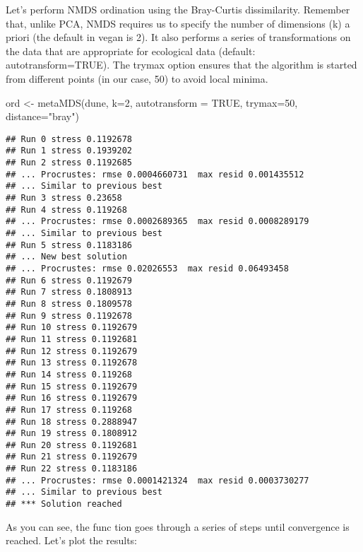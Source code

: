 \documentclass[
]{book}
\newenvironment{Shaded}{\begin{snugshade}}{\end{snugshade}}
\newcommand{\AttributeTok}[1]{\textcolor[rgb]{0.77,0.63,0.00}{#1}}
\newcommand{\ConstantTok}[1]{\textcolor[rgb]{0.00,0.00,0.00}{#1}}
\newcommand{\DecValTok}[1]{\textcolor[rgb]{0.00,0.00,0.81}{#1}}
\newcommand{\FunctionTok}[1]{\textcolor[rgb]{0.00,0.00,0.00}{#1}}
\newcommand{\NormalTok}[1]{#1}
\newcommand{\OtherTok}[1]{\textcolor[rgb]{0.56,0.35,0.01}{#1}}
\newcommand{\StringTok}[1]{\textcolor[rgb]{0.31,0.60,0.02}{#1}}
\begin{document}
Let's perform NMDS ordination using the Bray-Curtis dissimilarity. Remember that, unlike PCA, NMDS requires us to specify the number of dimensions (k) a priori (the default in vegan is 2). It also performs a series of transformations on the data that are appropriate for ecological data (default: autotransform=TRUE). The trymax option ensures that the algorithm is started from different points (in our case, 50) to avoid local minima.

\begin{Shaded}
\begin{Highlighting}[]
\NormalTok{ord }\OtherTok{\textless{}{-}} \FunctionTok{metaMDS}\NormalTok{(dune, }\AttributeTok{k=}\DecValTok{2}\NormalTok{, }\AttributeTok{autotransform =} \ConstantTok{TRUE}\NormalTok{, }\AttributeTok{trymax=}\DecValTok{50}\NormalTok{, }\AttributeTok{distance=}\StringTok{"bray"}\NormalTok{)}
\end{Highlighting}
\end{Shaded}

\begin{verbatim}
## Run 0 stress 0.1192678 
## Run 1 stress 0.1939202 
## Run 2 stress 0.1192685 
## ... Procrustes: rmse 0.0004660731  max resid 0.001435512 
## ... Similar to previous best
## Run 3 stress 0.23658 
## Run 4 stress 0.119268 
## ... Procrustes: rmse 0.0002689365  max resid 0.0008289179 
## ... Similar to previous best
## Run 5 stress 0.1183186 
## ... New best solution
## ... Procrustes: rmse 0.02026553  max resid 0.06493458 
## Run 6 stress 0.1192679 
## Run 7 stress 0.1808913 
## Run 8 stress 0.1809578 
## Run 9 stress 0.1192678 
## Run 10 stress 0.1192679 
## Run 11 stress 0.1192681 
## Run 12 stress 0.1192679 
## Run 13 stress 0.1192678 
## Run 14 stress 0.119268 
## Run 15 stress 0.1192679 
## Run 16 stress 0.1192679 
## Run 17 stress 0.119268 
## Run 18 stress 0.2888947 
## Run 19 stress 0.1808912 
## Run 20 stress 0.1192681 
## Run 21 stress 0.1192679 
## Run 22 stress 0.1183186 
## ... Procrustes: rmse 0.0001421324  max resid 0.0003730277 
## ... Similar to previous best
## *** Solution reached
\end{verbatim}

As you can see, the func tion goes through a series of steps until convergence is reached. Let's plot the results:
\end{document}

